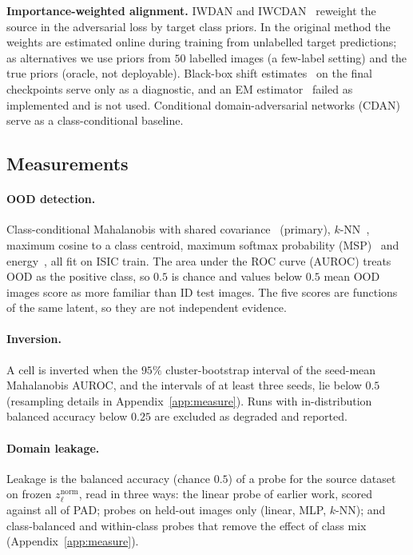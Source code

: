 \documentclass{midl}
\begin{document}
\textbf{Importance-weighted alignment.} IWDAN and IWCDAN~\cite{tachet2020domain} reweight
the source in the adversarial loss by target class priors. In the original method the
weights are estimated online during training from unlabelled target predictions; as
alternatives we use priors from $50$ labelled \texttt{} images (a few-label setting) and
the true \texttt{} priors (oracle, not deployable). Black-box shift
estimates~\cite{lipton2018bbse} on the final checkpoints serve only as a diagnostic, and an EM
estimator~\cite{saerens2002} failed as implemented and is not used. Conditional domain-adversarial
networks (CDAN)~\cite{long2018cdan} serve as a class-conditional baseline.

\subsection{Measurements}

\paragraph{OOD detection.} Class-conditional Mahalanobis with shared
covariance~\cite{lee2018} (primary), $k$-NN~\cite{sun2022}, maximum cosine to a class
centroid, maximum softmax probability (MSP)~\cite{hendrycks2017} and energy~\cite{liu2020}, all
fit on ISIC train. The area under the ROC curve (AUROC) treats OOD as the positive class, so $0.5$ is chance and values
below $0.5$ mean OOD images score as more familiar than ID test images. The five scores
are functions of the same latent, so they are not independent evidence.

\paragraph{Inversion.} A cell is inverted when the $95\%$ cluster-bootstrap interval of the
seed-mean Mahalanobis AUROC, and the intervals of at least three seeds, lie below $0.5$
(resampling details in Appendix~\ref{app:measure}). Runs with in-distribution balanced
accuracy below $0.25$ are excluded as degraded and reported.

\paragraph{Domain leakage.} Leakage is the balanced accuracy (chance $0.5$) of a probe for the
source dataset on frozen $z_\ell^{\mathrm{norm}}$, read in three ways: the linear probe of
earlier work, scored against all of PAD; probes on held-out images only (linear, MLP,
$k$-NN); and class-balanced and within-class probes that remove the effect of class mix
(Appendix~\ref{app:measure}).
\end{document}
